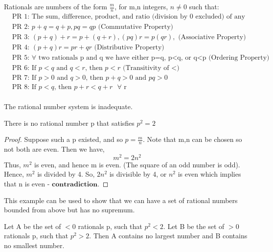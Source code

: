 \documentclass[11pt,fleqn]{book} %
\begin{document}
\begin{definition}
Rationals are numbers of the form $\frac{m}{n}$, for m,n integers, $n \neq 0$ such that:
\begin{align*}
& \text{PR 1: The sum, difference, product, and ratio (division by 0 excluded) of any two rationals is a rational.}\\
& \text{PR 2: } p+q = q+p, pq=qp \text{ (Commutative Property)}\\
& \text{PR 3: } (p+q)+r = p+(q+r), (pq)r = p(qr), \text{ (Associative Property)} \\
& \text{PR 4: } (p+q)r = pr + qr \text{ (Distributive Property)} \\
& \text{PR 5: } \forall \text{ two rationals p and q we have either p=q, p<q, or q<p (Ordering Property)} \\
& \text{PR 6: If $p<q$ and $q<r$, then $p<r$ (Transitivity of <)}\\
& \text{PR 7: If $p>0$ and $q>0$, then $p+q>0$ and $pq >0$} \\
& \text{PR 8: If $p<q$, then $p+r<q+r$  $\forall$ r} \\
\end{align*}
\end{definition}

The rational number system is inadequate. 

\begin{example}
	There is no rational number p that satisfies $p^2 = 2$
\end{example}

	\begin{proof}
		Suppose such a p existed, and so $p=\frac{m}{n}$. Note that m,n can be chosen so not both are even. Then we have,
		$$m^2 = 2n^2 $$
		Thus, $m^2$ is even, and hence m is even. (The square of an odd number is odd). Hence, $m^2$ is divided by 4. So, $2n^2$ is divisible by 4, or $n^2$ is even which implies that n is even - $\textbf{contradiction}$.
	\end{proof}

This example can be used to show that we can have a set of rational numbers bounded from above but has no supremum. 

\begin{example}
	Let A be the set of $<0$ rationals p, such that $p^2 <2$. Let B be the set of $>0$ rationals p, such that $p^2 >2$. Then A contains no largest number and B contains no smallest number.
\end{example}
\end{document}
